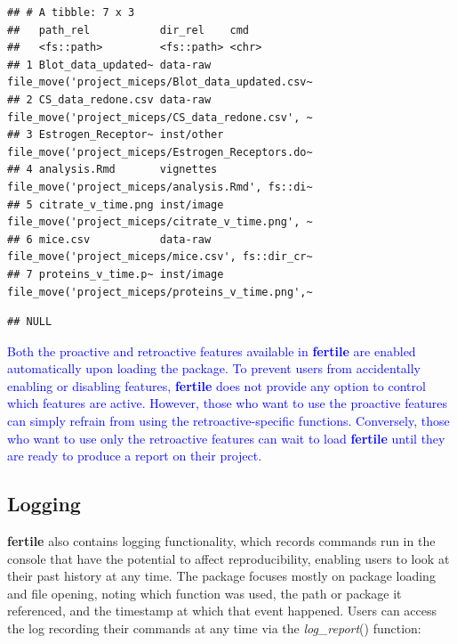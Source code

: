 \documentclass[APA,LATO1COL]{WileyNJD-v2}\usepackage[]{graphicx}\usepackage[]{color}
\makeatletter
\newenvironment{kframe}{%
 \def\at@end@of@kframe{}%
 \ifinner\ifhmode%
  \def\at@end@of@kframe{\end{minipage}}%
  \begin{minipage}{\columnwidth}%
 \fi\fi%
 \def\FrameCommand##1{\hskip\@totalleftmargin \hskip-\fboxsep
 \colorbox{shadecolor}{##1}\hskip-\fboxsep
     \hskip-\linewidth \hskip-\@totalleftmargin \hskip\columnwidth}%
 \MakeFramed {\advance\hsize-\width
   \@totalleftmargin\z@ \linewidth\hsize
   \@setminipage}}%
 {\par\unskip\endMakeFramed%
 \at@end@of@kframe}
\newenvironment{knitrout}{}{} %
\newcommand{\pkg}[1]{\textbf{#1}}
\newcommand{\func}[1]{\textit{#1}()}
\makeatother
\begin{document}
\begin{knitrout}
\begin{kframe}
{\ttfamily\noindent\itshape\color{messagecolor}{\#\# --\ \  Suggestions for moving files ------------------------------------------------------------------------------------------------ fertile 0.0.0.9028 --}}\begin{verbatim}
## # A tibble: 7 x 3
##   path_rel           dir_rel    cmd                                             
##   <fs::path>         <fs::path> <chr>                                           
## 1 Blot_data_updated~ data-raw   file_move('project_miceps/Blot_data_updated.csv~
## 2 CS_data_redone.csv data-raw   file_move('project_miceps/CS_data_redone.csv', ~
## 3 Estrogen_Receptor~ inst/other file_move('project_miceps/Estrogen_Receptors.do~
## 4 analysis.Rmd       vignettes  file_move('project_miceps/analysis.Rmd', fs::di~
## 5 citrate_v_time.png inst/image file_move('project_miceps/citrate_v_time.png', ~
## 6 mice.csv           data-raw   file_move('project_miceps/mice.csv', fs::dir_cr~
## 7 proteins_v_time.p~ inst/image file_move('project_miceps/proteins_v_time.png',~
\end{verbatim}


{\ttfamily\noindent\itshape\color{messagecolor}{\#\# --\ \  Problematic paths logged ---------------------------------------------------------------------------------------------------- fertile 0.0.0.9028 --}}\begin{verbatim}
## NULL
\end{verbatim}
\end{kframe}
\end{knitrout}

\textcolor{blue}{Both the proactive and retroactive features available in \pkg{fertile} are enabled automatically upon loading the package. To prevent users from accidentally enabling or disabling features, \pkg{fertile} does not provide any option to control which features are active. However, those who want to use the proactive features can simply  refrain from using the retroactive-specific functions.
Conversely, those who want to use only the retroactive features can wait to load \pkg{fertile} until they are ready to produce a report on their project.}

\subsection{Logging}

\pkg{fertile} also contains logging functionality, which records commands run in the console that have the potential to affect reproducibility, enabling users to look at their past history at any time. The package focuses mostly on package loading and file opening, noting which function was used, the path or package it referenced, and the timestamp at which that event happened. Users can access the log recording their commands at any time via the \func{log\_report} function:
\end{document}
